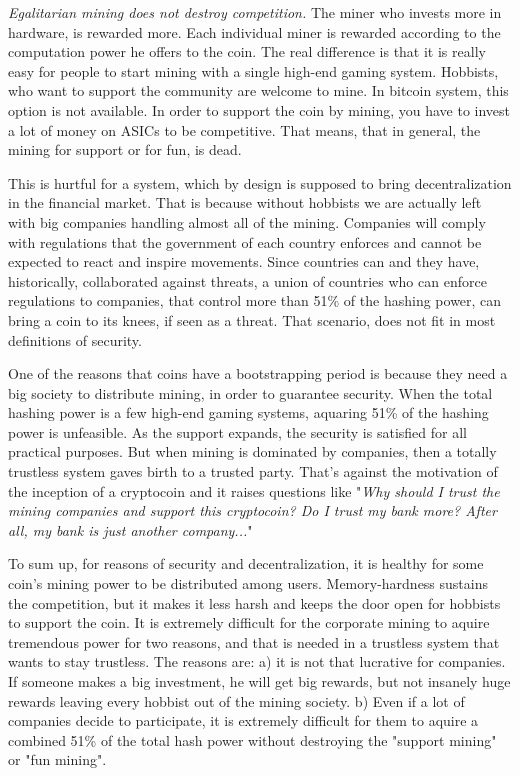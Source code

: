\emph{Egalitarian mining does not destroy competition.} The miner who invests more in hardware, is rewarded more. Each individual miner is rewarded according to the computation power he offers to the coin. The real difference is that it is really easy for people to start mining with a single high-end gaming system. Hobbists, who want to support the community are welcome to mine. In bitcoin system, this option is not available. In order to support the coin by mining, you have to invest a lot of money on ASICs to be competitive. That means, that in general, the mining for support or for fun, is dead.

This is hurtful for a system, which by design is supposed to bring decentralization in the financial market. That is because without hobbists we are actually left with big companies handling almost all of the mining. Companies will comply with regulations that the government of each country enforces and cannot be expected to react and inspire movements. Since countries can and they have, historically, collaborated against threats, a union of countries who can enforce regulations to companies, that control more than 51\% of the hashing power, can bring a coin to its knees, if seen as a threat. That scenario, does not fit in most definitions of security.

One of the reasons that coins have a bootstrapping period is because they need a big society to distribute mining, in order to guarantee security. When the total hashing power is a few high-end gaming systems, aquaring 51\% of the hashing power is unfeasible. As the support expands, the security is satisfied for all practical purposes. But when mining is dominated by companies, then a totally trustless system gaves birth to a trusted party. That's against the motivation of the inception of a cryptocoin and it raises questions like "\emph{Why should I trust the mining companies and support this cryptocoin? Do I trust my bank more? After all, my bank is just another company...}"

To sum up, for reasons of security and decentralization, it is healthy for some coin's mining power to be distributed among users. Memory-hardness sustains the competition, but it makes it less harsh and keeps the door open for hobbists to support the coin. It is extremely difficult for the corporate mining to aquire tremendous power for two reasons, and that is needed in a trustless system that wants to stay trustless. The reasons are: a) it is not that lucrative for companies. If someone makes a big investment, he will get big rewards, but not insanely huge rewards leaving every hobbist out of the mining society. b) Even if a lot of companies decide to participate, it is extremely difficult for them to aquire a combined 51\% of the total hash power without destroying the "support mining" or "fun mining".

